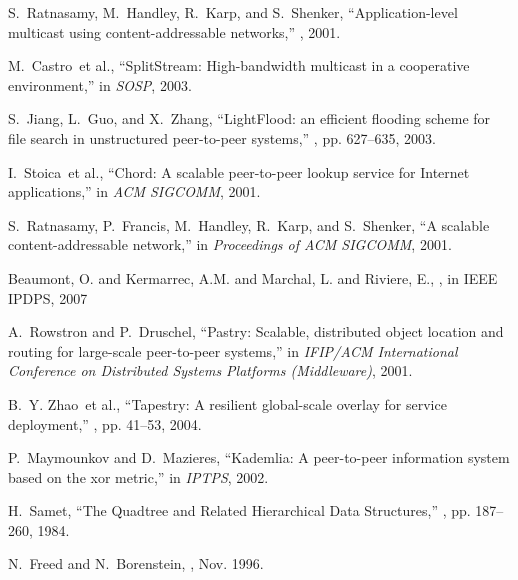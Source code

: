 \documentclass[fleqn,12pt,twoside]{article}
\begin{document}
\begin{thebibliography}{10}

S.~Ratnasamy, M.~Handley, R.~Karp, and S.~Shenker,
\newblock ``{Application-level multicast using content-addressable networks},''
, 2001.

M.~Castro~et al.,
\newblock ``{SplitStream}: High-bandwidth multicast in a cooperative
  environment,''
\newblock in {\em SOSP}, 2003.

S.~Jiang, L.~Guo, and X.~Zhang,
\newblock ``{LightFlood: an efficient flooding scheme for file search in
  unstructured peer-to-peer systems},''
, pp. 627--635,
  2003.

I.~Stoica~et al.,
\newblock ``Chord: A scalable peer-to-peer lookup service for {I}nternet
  applications,''
\newblock in {\em ACM SIGCOMM}, 2001.

S.~Ratnasamy, P.~Francis, M.~Handley, R.~Karp, and S.~Shenker,
\newblock ``A scalable content-addressable network,''
\newblock in {\em Proceedings of ACM SIGCOMM}, 2001.

Beaumont, O. and Kermarrec, A.M. and Marchal, L. and Riviere, E.,
,
\newblock in {IEEE IPDPS}, 2007

A.~Rowstron and P.~Druschel,
\newblock ``Pastry: Scalable, distributed object location and routing for
  large-scale peer-to-peer systems,''
\newblock in {\em IFIP/ACM International Conference on Distributed Systems
  Platforms (Middleware)}, 2001.

B.~Y. Zhao~et al.,
\newblock ``Tapestry: A resilient global-scale overlay for service
  deployment,''
, pp. 41--53, 2004.

P.~Maymounkov and D.~Mazieres,
\newblock ``Kademlia: A peer-to-peer information system based on the xor
  metric,''
\newblock in {\em IPTPS}, 2002.

H.~Samet,
\newblock ``{The Quadtree and Related Hierarchical Data Structures},''
, pp. 187--260,
  1984.

N.~Freed and N.~Borenstein,
, Nov. 1996.


\end{thebibliography}
\end{document}
